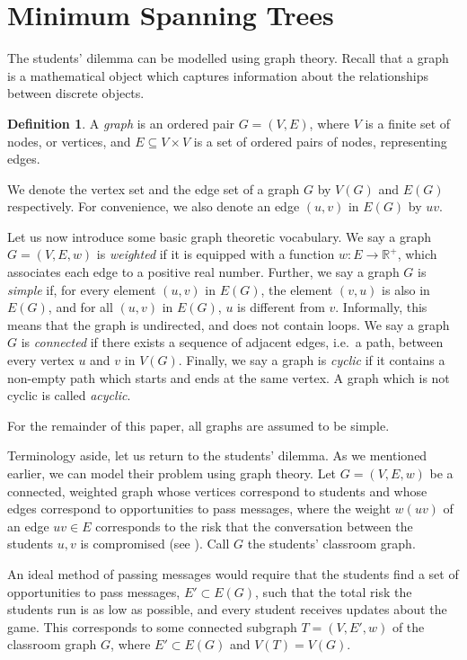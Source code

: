 \documentclass[a4paper,11pt]{report}
\theoremstyle{plain}
\theoremstyle{definition}
\newtheorem{defn}[thm]{Definition}
\begin{document}
\section{Minimum Spanning Trees}

The students' dilemma can be modelled using graph theory. Recall that a graph
is a mathematical object which captures information about the relationships
between discrete objects.

\begin{defn}
A \emph{graph} is an ordered pair $G = (V,E)$, where $V$ is a finite set of
nodes, or vertices, and $E \subseteq V \times V$ is a set of ordered pairs of
nodes, representing edges.
\end{defn}

We denote the vertex set and the edge set of a graph $G$ by $V(G)$ and $E(G)$
respectively. For convenience, we also denote an edge $(u,v)$ in $E(G)$ by
$uv$.

Let us now introduce some basic graph theoretic vocabulary. We say a graph $G =
(V,E,w)$ is \emph{weighted} if it is equipped with a function $w: E \to
\mathbb{R}^+$, which associates each edge to a positive real number. Further,
we say a graph $G$ is \emph{simple} if, for every element $(u,v)$ in $E(G)$,
the element $(v,u)$ is also in $E(G)$, and for all $(u,v)$ in $E(G)$, $u$ is
different from $v$. Informally, this means that the graph is undirected, and
does not contain loops. We say a graph $G$ is \emph{connected} if there exists
a sequence of adjacent edges, i.e.~a path, between every vertex $u$ and $v$ in
$V(G)$.  Finally, we say a graph is \emph{cyclic} if it contains a non-empty
path which starts and ends at the same vertex. A graph which is not cyclic is
called \emph{acyclic}.

For the remainder of this paper, all graphs are assumed to be simple.

Terminology aside, let us return to the students' dilemma. As we mentioned
earlier, we can model their problem using graph theory. Let $G = (V, E, w)$ be
a connected, weighted graph whose vertices correspond to students and whose
edges correspond to opportunities to pass messages, where the weight $w(uv)$ of
an edge $uv \in E$ corresponds to the risk that the conversation between the
students $u,v$ is compromised (see ).
Call $G$ the students' classroom graph.



An ideal method of passing messages would require that the students find a set
of opportunities to pass messages, $E' \subset E(G)$, such that the total risk
the students run is as low as possible, and every student receives updates
about the game. This corresponds to some connected subgraph $T = (V, E', w)$ of
the classroom graph $G$, where $E' \subset E(G)$ and $V(T) = V(G)$.
\end{document}
